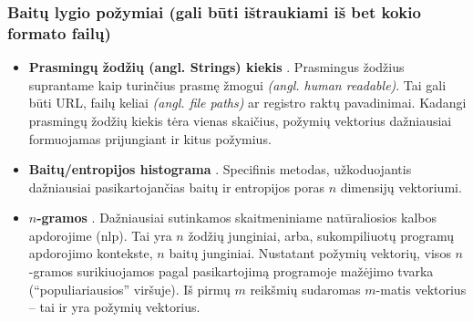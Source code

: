 \subsubsection{Baitų lygio požymiai (gali būti ištraukiami iš bet kokio formato failų)}\label{sec:literature:features:byte}
\begin{itemize}
    \item \textbf{Prasmingų žodžių (angl. Strings) kiekis} \cite{andersonLearningEvadeStatic2018}. Prasmingus žodžius suprantame kaip turinčius prasmę žmogui \textit{(angl. human readable)}. Tai gali būti URL, failų keliai \textit{(angl. file paths)} ar registro raktų pavadinimai. Kadangi prasmingų žodžių kiekis tėra vienas skaičius, požymių vektorius dažniausiai formuojamas prijungiant ir kitus požymius.
    \item \textbf{Baitų/entropijos histograma} \cite{saxeDeepNeuralNetwork2015}. Specifinis metodas, užkoduojantis dažniausiai pasikartojančias baitų ir entropijos poras $n$ dimensijų vektoriumi.
    \item \textbf{$n$-gramos} \cite{zhuNgramMalGANEvading2022}. Dažniausiai sutinkamos skaitmeniniame natūraliosios kalbos apdorojime (\acs{nlp}). Tai yra $n$ žodžių junginiai, arba, sukompiliuotų programų apdorojimo kontekste, $n$ baitų junginiai. Nustatant požymių vektorių, visos $n$-gramos surikiuojamos pagal pasikartojimą programoje mažėjimo tvarka (\enquote{populiariausios} viršuje). Iš pirmų $m$ reikšmių sudaromas $m$-matis vektorius -- tai ir yra požymių vektorius.
\end{itemize}